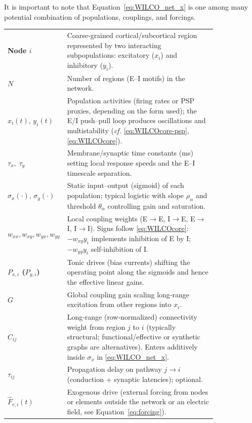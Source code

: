 \documentclass[12pt]{article}
\numberwithin{equation}{section}
\begin{document}
It is important to note that Equation~\ref{eq:WILCO_net_x} is one among many potential combination of populations, couplings, and forcings. 

\begin{tcolorbox}[
  colback=gray!5,
  colframe=slate,
  colbacktitle=softblue!25,
  coltitle=softblue!60!black,
  fonttitle=\bfseries\small,
  title={\small \textit{Wilson-Cowan Network (Eq.~\ref{eq:WILCO_net_x})} \\ Whole-brain Simulations Parameters \& Physiological Meaning},
  boxrule=0.4pt, enhanced, sharp corners,
  left=4pt,right=4pt,top=3pt,bottom=3pt,
  boxsep=2pt, before skip=6pt, after skip=6pt
]
\scriptsize
\begin{tabular}{@{}l p{0.82\linewidth}@{}}
\textbf{Node $i$} & Coarse‑grained cortical/subcortical region represented by two interacting subpopulations: excitatory ($x_i$) and inhibitory ($y_i$).\\
\textbf{$N$} & Number of regions (E–I motifs) in the network.\\
\textbf{$x_i(t),\,y_i(t)$} & Population activities (firing rates or PSP proxies, depending on the form used); the E/I push–pull loop produces oscillations and multistability (\emph{cf.} \eqref{eq:WILCOcore-psp}, \eqref{eq:WILCOcore}).\\
\textbf{$\tau_x,\;\tau_y$} & Membrane/synaptic time constants (ms) setting local response speeds and the E–I timescale separation.\\
\textbf{$\sigma_x(\cdot),\,\sigma_y(\cdot)$} & Static input–output (sigmoid) of each population; typical logistic with slope $\rho_{\alpha}$ and threshold $\theta_{\alpha}$ controlling gain and saturation.\\
\textbf{$w_{xx},w_{xy},w_{yx},w_{yy}$} & Local coupling weights (E$\to$E, I$\to$E, E$\to$I, I$\to$I). Signs follow \eqref{eq:WILCOcore}: $-w_{xy}y_i$ implements inhibition of E by I; $-w_{yy}y_i$ self‑inhibition of I.\\
\textbf{$P_{x,i}$ ($P_{y,i}$)} & Tonic drives (bias currents) shifting the operating point along the sigmoids and hence the effective linear gains.\\
\textbf{$G$} & Global coupling gain scaling long‑range excitation from other regions into $x_i$.\\
\textbf{$C_{ij}$} & Long‑range (row‑normalized) connectivity weight from region $j$ to $i$ (typically structural; functional/effective or synthetic graphs are alternatives). Enters additively inside $\sigma_x$ in \eqref{eq:WILCO_net_x}.\\
\textbf{$\tau_{ij}$} & Propagation delay on pathway $j{\to}i$ (conduction + synaptic latencies); optional.\\
\textbf{$\hat F_{e;i}(t)$}& Exogenous drive  (external forcing from nodes or elements outside the network or an electric field, see Equation~\ref{eq:forcing}). 
\end{tabular}
\end{tcolorbox}
\end{document}
